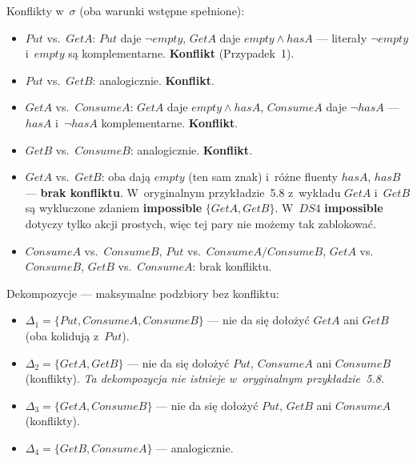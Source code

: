 \documentclass[11pt,a4paper]{article}
\newcommand{\impossible}{\textbf{impossible}}
\begin{document}
\smallskip\noindent
Konflikty w~$\sigma$ (oba warunki wstępne spełnione):
\begin{itemize}
  \item $\mathit{Put}$ vs.\ $\mathit{GetA}$:
        $\mathit{Put}$ daje $\neg\mathit{empty}$,
        $\mathit{GetA}$ daje $\mathit{empty} \land \mathit{hasA}$ ---
        literały $\neg\mathit{empty}$ i~$\mathit{empty}$ są komplementarne.
        \textbf{Konflikt} (Przypadek~1).
  \item $\mathit{Put}$ vs.\ $\mathit{GetB}$: analogicznie. \textbf{Konflikt}.
  \item $\mathit{GetA}$ vs.\ $\mathit{ConsumeA}$:
        $\mathit{GetA}$ daje $\mathit{empty} \land \mathit{hasA}$,
        $\mathit{ConsumeA}$ daje $\neg\mathit{hasA}$ ---
        $\mathit{hasA}$ i~$\neg\mathit{hasA}$ komplementarne.
        \textbf{Konflikt}.
  \item $\mathit{GetB}$ vs.\ $\mathit{ConsumeB}$: analogicznie. \textbf{Konflikt}.
  \item $\mathit{GetA}$ vs.\ $\mathit{GetB}$:
        oba dają $\mathit{empty}$ (ten sam znak) i~różne fluenty $\mathit{hasA}$,
        $\mathit{hasB}$ --- \textbf{brak konfliktu}.
        W~oryginalnym przykładzie~5.8 z~wykładu $\mathit{GetA}$ i~$\mathit{GetB}$
        są wykluczone zdaniem \impossible{} $\{\mathit{GetA}, \mathit{GetB}\}$.
        W~$\mathit{DS4}$ \impossible{} dotyczy tylko akcji prostych, więc
        tej pary nie możemy tak zablokować.
  \item $\mathit{ConsumeA}$ vs.\ $\mathit{ConsumeB}$,
        $\mathit{Put}$ vs.\ $\mathit{ConsumeA}/\mathit{ConsumeB}$,
        $\mathit{GetA}$ vs.\ $\mathit{ConsumeB}$,
        $\mathit{GetB}$ vs.\ $\mathit{ConsumeA}$: brak konfliktu.
\end{itemize}

\noindent Dekompozycje --- maksymalne podzbiory bez konfliktu:
\begin{itemize}
  \item $\Delta_1 = \{\mathit{Put}, \mathit{ConsumeA}, \mathit{ConsumeB}\}$ ---
        nie da się dołożyć $\mathit{GetA}$ ani $\mathit{GetB}$
        (oba kolidują z~$\mathit{Put}$).
  \item $\Delta_2 = \{\mathit{GetA}, \mathit{GetB}\}$ ---
        nie da się dołożyć $\mathit{Put}$, $\mathit{ConsumeA}$
        ani $\mathit{ConsumeB}$ (konflikty).
        \emph{Ta dekompozycja nie istnieje w~oryginalnym przykładzie~5.8.}
  \item $\Delta_3 = \{\mathit{GetA}, \mathit{ConsumeB}\}$ ---
        nie da się dołożyć $\mathit{Put}$, $\mathit{GetB}$
        ani $\mathit{ConsumeA}$ (konflikty).
  \item $\Delta_4 = \{\mathit{GetB}, \mathit{ConsumeA}\}$ --- analogicznie.
\end{itemize}
\end{document}
